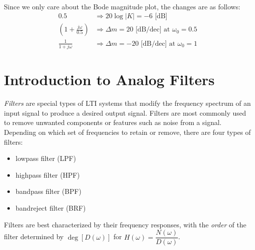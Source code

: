 \documentclass{report}
\begin{document}
\begin{solution}
\begin{align*}
    \end{align*}
    Since we only care about the Bode magnitude plot, the changes are as follows:
    \begin{align*}
        0.5 &\Longrightarrow 20\log|K| = -6\text{ [dB]} \\
        \left(1+\frac{j\omega}{0.5}\right) &\Longrightarrow \Delta m = 20 \text{ [dB/dec] at } \omega_0 = 0.5 \\
        \frac{1}{1+j\omega} &\Longrightarrow \Delta m = -20 \text{ [dB/dec] at } \omega_0 = 1
    \end{align*}
\end{solution}

\section{Introduction to Analog Filters}
\emph{Filters} are special types of LTI systems that modify the frequency spectrum of an input signal to produce a desired output signal. Filters are most commonly used to remove unwanted components or features such as noise from a signal. 
Depending on which set of frequencies to retain or remove, there are four types of filters:
\begin{itemize}
    \item lowpass filter (LPF)
    \item highpass filter (HPF)
    \item bandpass filter (BPF)
    \item bandreject filter (BRF)
\end{itemize}
Filters are best characterized by their frequency responses, with the \emph{order} of the filter determined by $\deg[D(\omega)]$ for $H(\omega)=\dfrac{N(\omega)}{D(\omega)}$.
\end{document}

